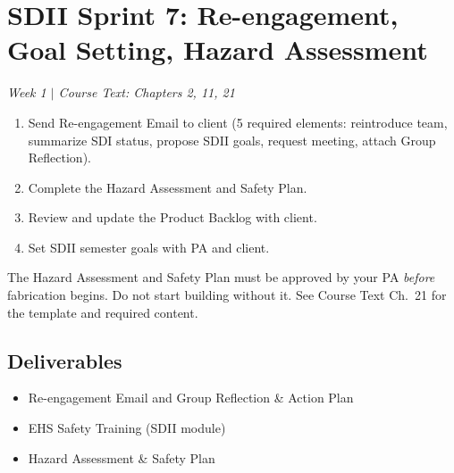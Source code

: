 \section{SDII Sprint 7: Re-engagement, Goal Setting, Hazard Assessment}
\textit{Week 1 $|$ Course Text: Chapters 2, 11, 21}

\begin{priorities}
\begin{enumerate}[nosep]
\item Send Re-engagement Email to client (5 required elements: reintroduce team, summarize SDI status, propose SDII goals, request meeting, attach Group Reflection).
\item Complete the Hazard Assessment and Safety Plan.
\item Review and update the Product Backlog with client.
\item Set SDII semester goals with PA and client.
\end{enumerate}
\end{priorities}

\begin{warnbox}
The Hazard Assessment and Safety Plan must be approved by your PA \emph{before} fabrication begins. Do not start building without it. See Course Text Ch.~21 for the template and required content.
\end{warnbox}

\subsection{Deliverables}
\begin{itemize}[nosep,leftmargin=1.5em]
\item Re-engagement Email and Group Reflection \& Action Plan
\item EHS Safety Training (SDII module)
\item Hazard Assessment \& Safety Plan
\end{itemize}



